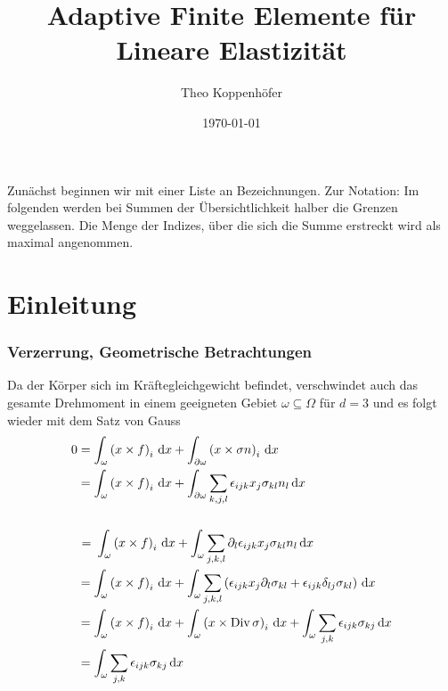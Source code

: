 \documentclass{scrartcl}
\author{Theo Koppenhöfer}
\date{\today}
\title{Adaptive Finite Elemente für Lineare Elastizität}
\newcommand{\tikzmark}[3][]{\tikz[remember picture,baseline] \node [anchor=base,#1](#2) {$#3$};}
\newcommand{\dif}[1]{\,\mathrm{d} #1}
\DeclareMathOperator{\diver}{Div}			%
\begin{document}
\maketitle

\tableofcontents

\newpage

Zunächst beginnen wir mit einer Liste an Bezeichnungen.
Zur Notation: Im folgenden werden bei Summen der Übersichtlichkeit halber die Grenzen weggelassen. Die Menge der Indizes, über die sich die Summe erstreckt wird als maximal angenommen.


\section{Einleitung}
\subsubsection*{Verzerrung, Geometrische Betrachtungen}

Da der Körper sich im Kräftegleichgewicht befindet, verschwindet auch das gesamte Drehmoment in einem geeigneten Gebiet $\omega\subseteq\Omega$ für $d=3$ und es folgt wieder mit dem Satz von Gauss
\begin{align*}
	0 &= \int_\omega \left(x\times f\right)_i\dif x + \int_{\partial\omega}\left(x\times\sigma n\right)_i\dif x \\
	&=\int_\omega \left(x\times f\right)_i\dif x + \int_{\partial\omega}\sum_{k,j,l}\epsilon_{ijk}x_j\sigma_{kl}n_l\dif x \\ \\
	&\tikzmark{gaussdrehimp}{=}\int_\omega \left(x\times f\right)_i\dif x + \int_{\omega}\sum_{j,k,l}\partial_l\epsilon_{ijk}x_j\sigma_{kl}n_l\dif x \\
	&=\int_\omega \left(x\times f\right)_i\dif x + \int_{\omega}\sum_{j,k,l}\left(\epsilon_{ijk}x_j\partial_l\sigma_{kl}+\epsilon_{ijk}\delta_{lj}\sigma_{kl}\right)\dif x \\
	&=\int_\omega \left(x\times f\right)_i\dif x + \int_{\omega}\left(x\times \diver\sigma \right)_i\dif x+\int_\omega\sum_{j,k}\epsilon_{ijk}\sigma_{kj}\dif x \\
	&= \int_\omega\sum_{j,k}\epsilon_{ijk}\sigma_{kj}\dif x
\end{align*}
\end{document}

